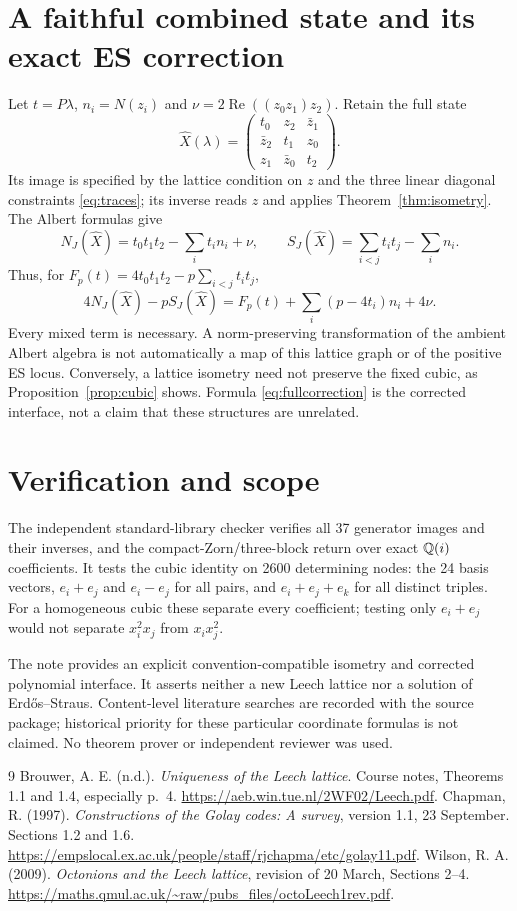 \documentclass[10pt,reqno]{amsart}
\theoremstyle{remark}\newtheorem{remark}[theorem]{Remark}
\begin{document}
\section{A faithful combined state and its exact ES correction}
Let $t=P\lambda$, $n_i=N(z_i)$ and $\nu=2\operatorname{Re}((z_0z_1)z_2)$. Retain the full state
\[
\widehat X(\lambda)=\begin{pmatrix}t_0&z_2&\bar z_1\\\bar z_2&t_1&z_0\\z_1&\bar z_0&t_2\end{pmatrix}.
\]
Its image is specified by the lattice condition on $z$ and the three linear diagonal constraints \eqref{eq:traces}; its inverse reads $z$ and applies Theorem~\ref{thm:isometry}. The Albert formulas give
\[
N_J(\widehat X)=t_0t_1t_2-\sum_i t_in_i+\nu,
\qquad S_J(\widehat X)=\sum_{i<j}t_it_j-\sum_i n_i.
\]
Thus, for $F_p(t)=4t_0t_1t_2-p\sum_{i<j}t_it_j$,
\begin{equation}\label{eq:fullcorrection}
\boxed{4N_J(\widehat X)-pS_J(\widehat X)
=F_p(t)+\sum_i(p-4t_i)n_i+4\nu.}
\end{equation}
Every mixed term is necessary. A norm-preserving transformation of the ambient Albert algebra is not automatically a map of this lattice graph or of the positive ES locus. Conversely, a lattice isometry need not preserve the fixed cubic, as Proposition~\ref{prop:cubic} shows. Formula \eqref{eq:fullcorrection} is the corrected interface, not a claim that these structures are unrelated.

\section{Verification and scope}
The independent standard-library checker verifies all 37 generator images and their inverses, and the compact-Zorn/three-block return over exact $\mathbb Q(i)$ coefficients. It tests the cubic identity on 2600 determining nodes: the 24 basis vectors, $e_i+e_j$ and $e_i-e_j$ for all pairs, and $e_i+e_j+e_k$ for all distinct triples. For a homogeneous cubic these separate every coefficient; testing only $e_i+e_j$ would not separate $x_i^2x_j$ from $x_ix_j^2$.

The note provides an explicit convention-compatible isometry and corrected polynomial interface. It asserts neither a new Leech lattice nor a solution of Erd\H{o}s--Straus. Content-level literature searches are recorded with the source package; historical priority for these particular coordinate formulas is not claimed. No theorem prover or independent reviewer was used.
\begin{thebibliography}{9}
 Brouwer, A. E. (n.d.). \emph{Uniqueness of the Leech lattice}. Course notes, Theorems 1.1 and 1.4, especially p.~4. \url{https://aeb.win.tue.nl/2WF02/Leech.pdf}.
 Chapman, R. (1997). \emph{Constructions of the Golay codes: A survey}, version 1.1, 23 September. Sections 1.2 and 1.6. \url{https://empslocal.ex.ac.uk/people/staff/rjchapma/etc/golay11.pdf}.
 Wilson, R. A. (2009). \emph{Octonions and the Leech lattice}, revision of 20 March, Sections 2--4. \url{https://maths.qmul.ac.uk/~raw/pubs_files/octoLeech1rev.pdf}.
\end{thebibliography}
\end{document}
